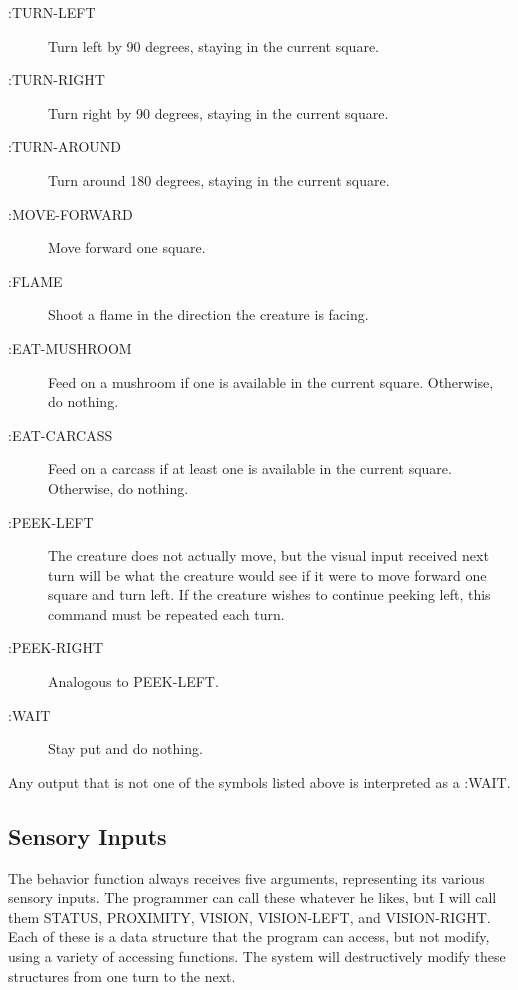 \documentclass[12pt]{article}
\begin{document}
\begin{description}
\item[:TURN-LEFT] Turn left by 90 degrees, staying in the current square.

\item[:TURN-RIGHT] Turn right by 90 degrees, staying in the current square.

\item[:TURN-AROUND] Turn around 180 degrees, staying in the current square.

\item[:MOVE-FORWARD] Move forward one square.

\item[:FLAME] Shoot a flame in the direction the creature is facing.

\item[:EAT-MUSHROOM] Feed on a mushroom if one is available in the
current square.  Otherwise, do nothing.

\item[:EAT-CARCASS] Feed on a carcass if at least one is available in
the current square.  Otherwise, do nothing.

\item[:PEEK-LEFT] The creature does not actually move, but the visual
input received next turn will be what the creature would see if it
were to move forward one square and turn left.  If the creature wishes
to continue peeking left, this command must be repeated each turn.

\item[:PEEK-RIGHT] Analogous to PEEK-LEFT.

\item[:WAIT] Stay put and do nothing.
\end{description}

Any output that is not one of the symbols listed above is interpreted as
a :WAIT.

\subsection {Sensory Inputs}

The behavior function always receives five arguments, representing its
various sensory inputs.  The programmer can call these whatever he
likes, but I will call them STATUS, PROXIMITY, VISION, VISION-LEFT, and
VISION-RIGHT.  Each of these is a data structure that the program can
access, but not modify, using a variety of accessing functions.  The
system will destructively modify these structures from one turn to the
next.
\end{document}
